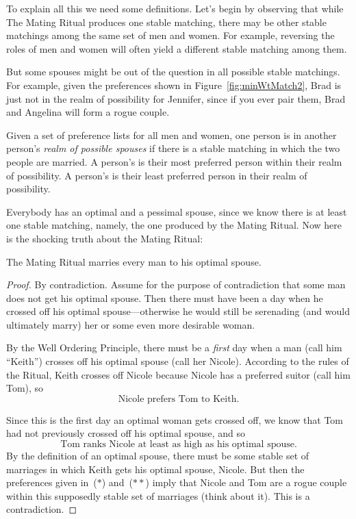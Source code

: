 To explain all this we need some definitions.  Let's begin by
observing that while The Mating Ritual produces one stable matching,
there may be other stable matchings among the same set of men and
women.  For example, reversing the roles of men and women will often
yield a different stable matching among them.

But some spouses might be out of the question in all possible stable
matchings.  For example, given the preferences shown in
Figure~\ref{fig:minWtMatch2}, Brad is just not in the realm of
possibility for Jennifer, since if you ever pair them, Brad and
Angelina will form a rogue couple.

\begin{definition}
Given a set of preference lists for all men and women, one person is
in another person's \emph{realm of possible spouses} if there is a
stable matching in which the two people are married.  A person's
 is their most preferred person within their
realm of possibility.  A person's  is their
least preferred person in their realm of possibility.
\end{definition}

Everybody has an optimal and a pessimal spouse, since we know there is at
least one stable matching, namely, the one produced by the Mating Ritual.
Now here is the shocking truth about the Mating Ritual:

\begin{theorem}\label{boyopt}
The Mating Ritual marries every man to his optimal spouse.
\end{theorem}

\begin{proof}
By contradiction.  Assume for the purpose of contradiction that some
man does not get his optimal spouse.  Then there must have been a day
when he crossed off his optimal spouse---otherwise he would still be
serenading (and would ultimately marry) her or some even more
desirable woman.

By the Well Ordering Principle, there must be a \emph{first} day when
a man (call him ``Keith'') crosses off his optimal spouse (call her
Nicole).
According to the rules of the Ritual, Keith crosses off Nicole because
Nicole has a preferred suitor (call him Tom), so
\begin{equation}
\text{Nicole prefers Tom to Keith.} \tag{$*$}
\end{equation}

Since this is the first day an optimal woman gets crossed off, we know
that Tom had not previously crossed off his optimal spouse, and so
\begin{equation}\tag{$**$}
\text{Tom ranks Nicole at least as high as his optimal spouse.}
\end{equation}
By the definition of an optimal spouse, there must be some stable set
of marriages in which Keith gets his optimal spouse, Nicole.  But then
the preferences given in~($*$) and~($**$) imply that Nicole and Tom
are a rogue couple within this supposedly stable set of marriages
(think about it).  This is a contradiction.
\end{proof}

